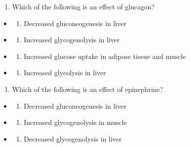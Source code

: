 \documentclass[
]{book}
\providecommand{\tightlist}{%
  \setlength{\itemsep}{0pt}\setlength{\parskip}{0pt}}
\begin{document}
\begin{enumerate}
\def\labelenumi{\arabic{enumi}.}
\setcounter{enumi}{1}
\tightlist
\item
  Which of the following is an effect of glucagon?
\end{enumerate}

\begin{itemize}
\tightlist
\item
  \begin{enumerate}
  \def\labelenumi{(\Alph{enumi})}
  \tightlist
  \item
    Decreased gluconeogenesis in liver\\
  \end{enumerate}
\item
  \begin{enumerate}
  \def\labelenumi{(\Alph{enumi})}
  \setcounter{enumi}{1}
  \tightlist
  \item
    Increased glycogenolysis in liver\\
  \end{enumerate}
\item
  \begin{enumerate}
  \def\labelenumi{(\Alph{enumi})}
  \setcounter{enumi}{2}
  \tightlist
  \item
    Increased glucose uptake in adipose tissue and muscle\\
  \end{enumerate}
\item
  \begin{enumerate}
  \def\labelenumi{(\Alph{enumi})}
  \setcounter{enumi}{3}
  \tightlist
  \item
    Increased glycolysis in liver
  \end{enumerate}
\end{itemize}

\begin{enumerate}
\def\labelenumi{\arabic{enumi}.}
\setcounter{enumi}{2}
\tightlist
\item
  Which of the following is an effect of epinephrine?
\end{enumerate}

\begin{itemize}
\tightlist
\item
  \begin{enumerate}
  \def\labelenumi{(\Alph{enumi})}
  \tightlist
  \item
    Decreased gluconeogenesis in liver\\
  \end{enumerate}
\item
  \begin{enumerate}
  \def\labelenumi{(\Alph{enumi})}
  \setcounter{enumi}{1}
  \tightlist
  \item
    Increased glycogenolysis in muscle\\
  \end{enumerate}
\item
  \begin{enumerate}
  \def\labelenumi{(\Alph{enumi})}
  \setcounter{enumi}{2}
  \tightlist
  \item
    Decreased glycogenolysis in liver
  \end{enumerate}
\end{itemize}
\end{document}
